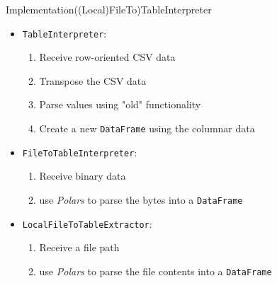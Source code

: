 \begin{frame}[t]{Implementation}{((Local)FileTo)TableInterpreter}
	\begin{itemize}[<+(1)->]
		\item \Verb|TableInterpreter|:
		      \begin{enumerate}
			      \item Receive row-oriented CSV data
			      \item Transpose the CSV data
			      \item Parse values using "old" functionality
			      \item Create a new \Verb|DataFrame| using the columnar data
		      \end{enumerate}
		\item \Verb|FileToTableInterpreter|:
		      \begin{enumerate}
			      \item Receive binary data
			      \item use \emph{Polars} to parse the bytes into a \Verb|DataFrame|
		      \end{enumerate}
		\item \Verb|LocalFileToTableExtractor|:
		      \begin{enumerate}
			      \item Receive a file path
			      \item use \emph{Polars} to parse the file contents into a \Verb|DataFrame|
		      \end{enumerate}
	\end{itemize}
\end{frame}

